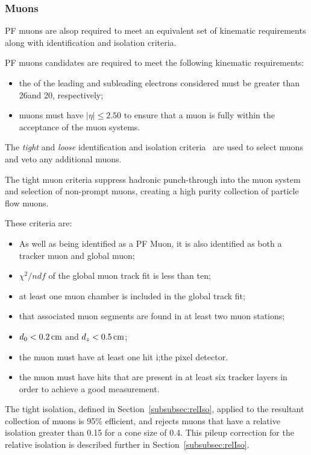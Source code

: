\subsubsection{Muons}\label{subsubsec:muonSelection}
PF muons are alsop required to meet an equivalent set of kinematic requirements along with identification and isolation criteria.

PF muons candidates are required to meet the following kinematic requirements:
\begin{itemize}
\item the \pt of the leading and subleading electrons considered must be greater than 26\GeVc and 20\GeVc, respectively;
\item muons must have $|\eta| \leq 2.50$ to ensure that a muon is fully within the acceptance of the muon systems.
\end{itemize}

The \emph{tight} and \emph{loose} identification and isolation criteria~\cite{Chatrchyan:2012xi} are used to select muons and veto any additional muons.

The tight muon criteria suppress hadronic punch-through into the muon system and selection of non-prompt muons, creating a high purity collection of particle flow muons.

These criteria are:
\begin{itemize}
\item As well as being identified as a PF Muon, it is also identified as both a tracker muon and global muon;
\item $\chi^{2}/ndf$ of the global muon track fit is less than ten;
\item at least one muon chamber is included in the global track fit;
\item that associated muon segments are found in at least two muon stations;
\item $d_{0} < 0.2\,\text{cm}$ and $d_{z} < 0.5\,\text{cm}$;
\item the muon must have at least one hit i;the pixel detector.
\item the muon must have hits that are present in at least six tracker layers in order to achieve a good \pT measurement.
\end{itemize}

The tight isolation, defined in Section~\ref{subsubsec:relIso}, applied to the resultant collection of muons is 95\% efficient, and rejects muons that have a relative isolation greater than 0.15 for a cone size of 0.4.
This pileup correction for the relative isolation is described further in Section~\ref{subsubsec:relIso}.

